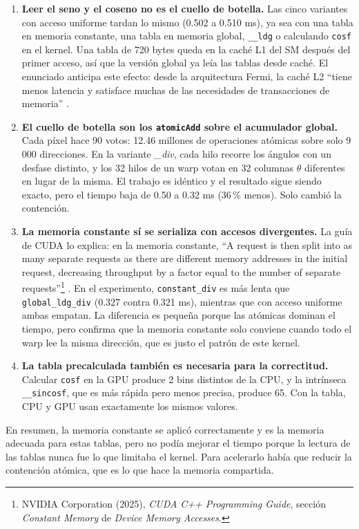 \begin{enumerate}
  \item \textbf{Leer el seno y el coseno no es el cuello de botella.} Las cinco variantes con acceso uniforme tardan lo mismo (0.502 a 0.510 ms), ya sea con una tabla en memoria constante, una tabla en memoria global, \texttt{\_\_ldg} o calculando \texttt{cosf} en el kernel. Una tabla de 720 bytes queda en la caché L1 del SM después del primer acceso, así que la versión global ya leía las tablas desde caché. El enunciado anticipa este efecto: desde la arquitectura Fermi, la caché L2 \enquote{tiene menos latencia y satisface muchas de las necesidades de transacciones de memoria} \cite{enunciado}.
  \item \textbf{El cuello de botella son los \texttt{atomicAdd} sobre el acumulador global.} Cada píxel hace 90 votos: 12.46 millones de operaciones atómicas sobre solo 9\,000 direcciones. En la variante \emph{\_div}, cada hilo recorre los ángulos con un desfase distinto, y los 32 hilos de un warp votan en 32 columnas $\theta$ diferentes en lugar de la misma. El trabajo es idéntico y el resultado sigue siendo exacto, pero el tiempo baja de 0.50 a 0.32 ms (36\,\% menos). Solo cambió la contención.
  \item \textbf{La memoria constante sí se serializa con accesos divergentes.} La guía de CUDA lo explica: en la memoria constante, \enquote{A request is then split into as many separate requests as there are different memory addresses in the initial request, decreasing throughput by a factor equal to the number of separate requests}\footnote{NVIDIA Corporation (2025), \textit{CUDA C++ Programming Guide}, sección \emph{Constant Memory} de \emph{Device Memory Accesses}.} \cite{cudaguide}. En el experimento, \texttt{constant\_div} es más lenta que \texttt{global\_ldg\_div} (0.327 contra 0.321 ms), mientras que con acceso uniforme ambas empatan. La diferencia es pequeña porque las atómicas dominan el tiempo, pero confirma que la memoria constante solo conviene cuando todo el warp lee la misma dirección, que es justo el patrón de este kernel.
  \item \textbf{La tabla precalculada también es necesaria para la correctitud.} Calcular \texttt{cosf} en la GPU produce 2 bins distintos de la CPU, y la intrínseca \texttt{\_\_sincosf}, que es más rápida pero menos precisa, produce 65. Con la tabla, CPU y GPU usan exactamente los mismos valores.
\end{enumerate}

En resumen, la memoria constante se aplicó correctamente y es la memoria adecuada para estas tablas, pero no podía mejorar el tiempo porque la lectura de las tablas nunca fue lo que limitaba el kernel. Para acelerarlo había que reducir la contención atómica, que es lo que hace la memoria compartida.
